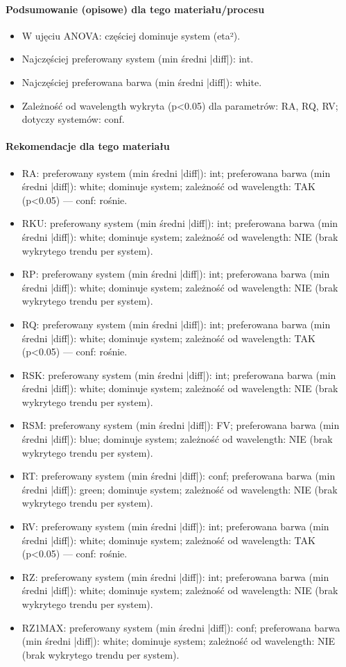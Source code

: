\documentclass[
  10pt,
]{article}
\begin{document}
\paragraph{Podsumowanie (opisowe) dla tego materiału/procesu}
\begin{itemize}
\item W ujęciu ANOVA: częściej dominuje system (eta²).
\item Najczęściej preferowany system (min średni |diff|): int.
\item Najczęściej preferowana barwa (min średni |diff|): white.
\item Zależność od wavelength wykryta (p<0.05) dla parametrów: RA, RQ, RV; dotyczy systemów: conf.
\end{itemize}
\paragraph{Rekomendacje dla tego materiału}
\begin{itemize}
\item RA: preferowany system (min średni |diff|): int; preferowana barwa (min średni |diff|): white; dominuje system; zależność od wavelength: TAK (p<0.05) — conf: rośnie.
\item RKU: preferowany system (min średni |diff|): int; preferowana barwa (min średni |diff|): white; dominuje system; zależność od wavelength: NIE (brak wykrytego trendu per system).
\item RP: preferowany system (min średni |diff|): int; preferowana barwa (min średni |diff|): white; dominuje system; zależność od wavelength: NIE (brak wykrytego trendu per system).
\item RQ: preferowany system (min średni |diff|): int; preferowana barwa (min średni |diff|): white; dominuje system; zależność od wavelength: TAK (p<0.05) — conf: rośnie.
\item RSK: preferowany system (min średni |diff|): int; preferowana barwa (min średni |diff|): white; dominuje system; zależność od wavelength: NIE (brak wykrytego trendu per system).
\item RSM: preferowany system (min średni |diff|): FV; preferowana barwa (min średni |diff|): blue; dominuje system; zależność od wavelength: NIE (brak wykrytego trendu per system).
\item RT: preferowany system (min średni |diff|): conf; preferowana barwa (min średni |diff|): green; dominuje system; zależność od wavelength: NIE (brak wykrytego trendu per system).
\item RV: preferowany system (min średni |diff|): int; preferowana barwa (min średni |diff|): white; dominuje system; zależność od wavelength: TAK (p<0.05) — conf: rośnie.
\item RZ: preferowany system (min średni |diff|): int; preferowana barwa (min średni |diff|): white; dominuje system; zależność od wavelength: NIE (brak wykrytego trendu per system).
\item RZ1MAX: preferowany system (min średni |diff|): conf; preferowana barwa (min średni |diff|): white; dominuje system; zależność od wavelength: NIE (brak wykrytego trendu per system).
\end{itemize}
\end{document}
